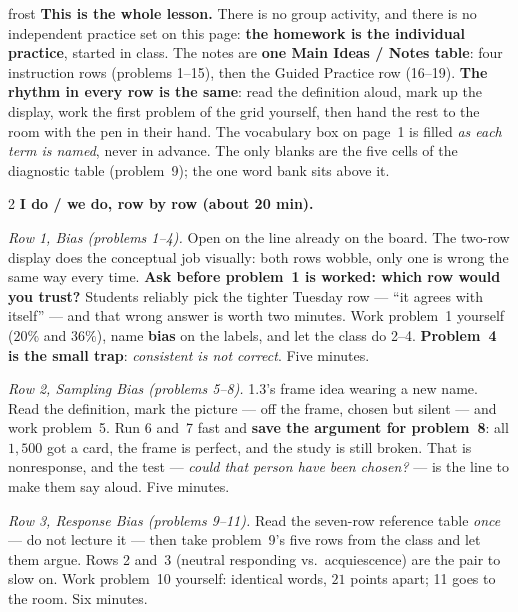 \documentclass[10pt]{article}
\begin{document}
\boxguard[40]
\begin{skillbox}{frost}
\textbf{This is the whole lesson.} There is no group activity, and there is no independent
practice set on this page: \textbf{the homework is the individual practice}, started in class.
The notes are \textbf{one Main Ideas / Notes table}: four instruction rows (problems 1--15),
then the Guided Practice row (16--19). \textbf{The rhythm in every row is the same}: read the
definition aloud, mark up the display, work the first problem of the grid yourself, then hand
the rest to the room with the pen in their hand. The vocabulary box on page~1 is filled
\emph{as each term is named}, never in advance. The only blanks are the five cells of the
diagnostic table (problem~9); the one word bank sits above it.
\begin{multicols}{2}
\textbf{I do / we do, row by row (about 20 min).}

\emph{Row 1, Bias (problems 1--4).} Open on the line already on the board. The two-row display
does the conceptual job visually: both rows wobble, only one is wrong the same way every time.
\textbf{Ask before problem~1 is worked: which row would you trust?} Students reliably pick the
tighter Tuesday row --- ``it agrees with itself'' --- and that wrong answer is worth two
minutes. Work problem~1 yourself ($20\%$ and $36\%$), name \textbf{bias} on the labels, and let
the class do 2--4. \textbf{Problem~4 is the small trap}: \emph{consistent is not correct}.
Five minutes.

\emph{Row 2, Sampling Bias (problems 5--8).} 1.3's frame idea wearing a new name. Read the
definition, mark the picture --- off the frame, chosen but silent --- and work problem~5.
Run 6 and~7 fast and \textbf{save the argument for problem~8}: all $1{,}500$ got a card, the
frame is perfect, and the study is still broken. That is nonresponse, and the test ---
\emph{could that person have been chosen?} --- is the line to make them say aloud. Five minutes.

\emph{Row 3, Response Bias (problems 9--11).} Read the seven-row reference table \emph{once}
--- do not lecture it --- then take problem~9's five rows from the class and let them argue.
Rows 2 and~3 (neutral responding vs.\ acquiescence) are the pair to slow on. Work problem~10
yourself: identical words, $21$ points apart; 11 goes to the room. Six minutes.


\end{multicols}
\end{skillbox}
\end{document}
